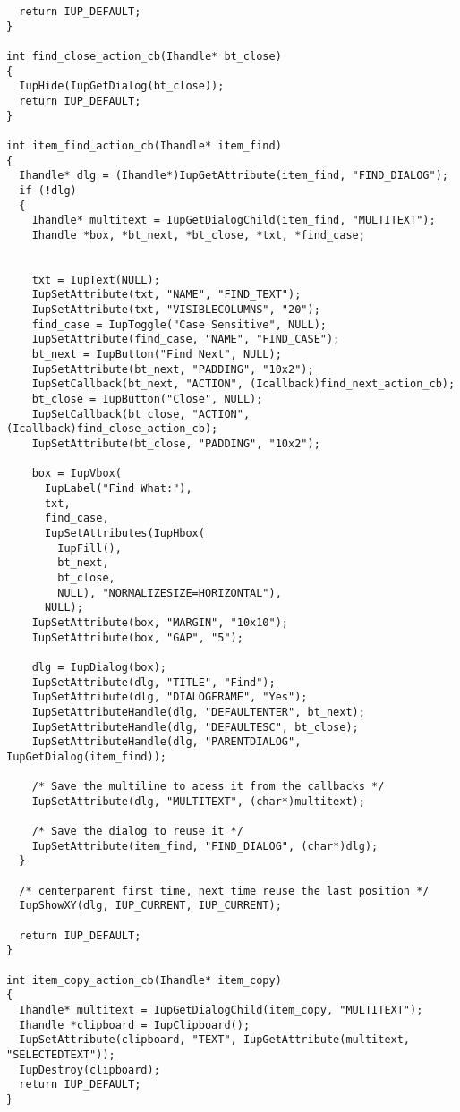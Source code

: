 \documentclass{ctexart}
\begin{document}
\begin{lstlisting}
  return IUP_DEFAULT;
}

int find_close_action_cb(Ihandle* bt_close)
{
  IupHide(IupGetDialog(bt_close));
  return IUP_DEFAULT;
}

int item_find_action_cb(Ihandle* item_find)
{
  Ihandle* dlg = (Ihandle*)IupGetAttribute(item_find, "FIND_DIALOG");
  if (!dlg)
  {
    Ihandle* multitext = IupGetDialogChild(item_find, "MULTITEXT");
    Ihandle *box, *bt_next, *bt_close, *txt, *find_case;


    txt = IupText(NULL);
    IupSetAttribute(txt, "NAME", "FIND_TEXT");
    IupSetAttribute(txt, "VISIBLECOLUMNS", "20");
    find_case = IupToggle("Case Sensitive", NULL);
    IupSetAttribute(find_case, "NAME", "FIND_CASE");
    bt_next = IupButton("Find Next", NULL);
    IupSetAttribute(bt_next, "PADDING", "10x2");
    IupSetCallback(bt_next, "ACTION", (Icallback)find_next_action_cb);
    bt_close = IupButton("Close", NULL);
    IupSetCallback(bt_close, "ACTION", (Icallback)find_close_action_cb);
    IupSetAttribute(bt_close, "PADDING", "10x2");

    box = IupVbox(
      IupLabel("Find What:"),
      txt,
      find_case,
      IupSetAttributes(IupHbox(
        IupFill(),
        bt_next,
        bt_close,
        NULL), "NORMALIZESIZE=HORIZONTAL"),
      NULL);
    IupSetAttribute(box, "MARGIN", "10x10");
    IupSetAttribute(box, "GAP", "5");

    dlg = IupDialog(box);
    IupSetAttribute(dlg, "TITLE", "Find");
    IupSetAttribute(dlg, "DIALOGFRAME", "Yes");
    IupSetAttributeHandle(dlg, "DEFAULTENTER", bt_next);
    IupSetAttributeHandle(dlg, "DEFAULTESC", bt_close);
    IupSetAttributeHandle(dlg, "PARENTDIALOG", IupGetDialog(item_find));

    /* Save the multiline to acess it from the callbacks */
    IupSetAttribute(dlg, "MULTITEXT", (char*)multitext);

    /* Save the dialog to reuse it */
    IupSetAttribute(item_find, "FIND_DIALOG", (char*)dlg);
  }

  /* centerparent first time, next time reuse the last position */
  IupShowXY(dlg, IUP_CURRENT, IUP_CURRENT);

  return IUP_DEFAULT;
}

int item_copy_action_cb(Ihandle* item_copy) 
{
  Ihandle* multitext = IupGetDialogChild(item_copy, "MULTITEXT");
  Ihandle *clipboard = IupClipboard();
  IupSetAttribute(clipboard, "TEXT", IupGetAttribute(multitext, "SELECTEDTEXT"));
  IupDestroy(clipboard);
  return IUP_DEFAULT;
}


\end{lstlisting}
\end{document}
